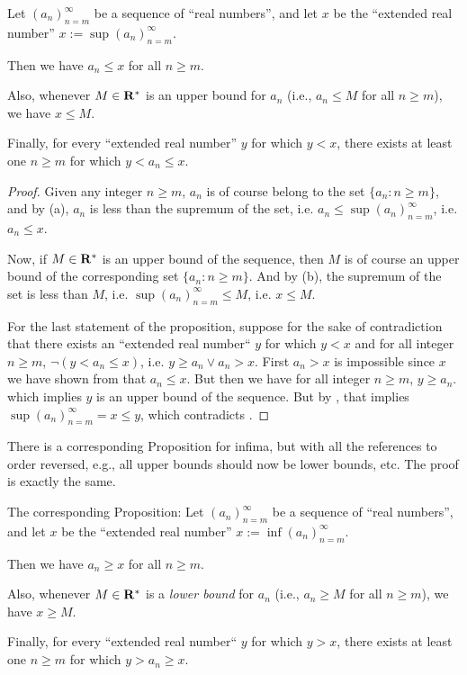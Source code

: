 \begin{proposition}  \label{prop 6.3.6}
Let \((a_n)_{n = m}^{\infty}\) be a sequence of ``real numbers'', and let \(x\) be the ``extended real number'' \(x := \sup(a_n)_{n = m}^{\infty}\).

 Then we have \(a_n \le x\) for all \(n \ge m\).

 Also, whenever \(M \in \mathbf{R}^*\) is an upper bound for \(a_n\) (i.e., \(a_n \le M\) for all \(n \ge m\)), we have \(x \le M\).

 Finally, for every ``extended real number'' \(y\) for which \(y < x\), there exists at least one \(n \ge m\) for which \(y < a_n \le x\).
\end{proposition}

\begin{proof}
 Given any integer \(n \ge m\), \(a_n\) is of course belong to the set \(\{a_n : n \ge m\}\), and by (a), \(a_n\) is less than the supremum of the set, i.e. \(a_n \le \sup(a_n)_{n = m}^{\infty}\), i.e. \(a_n \le x\).

 Now, if \(M \in \mathbf{R}^*\) is an upper bound of the sequence, then \(M\) is of course an upper bound of the corresponding set \(\{a_n : n \ge m\}\).
And by (b), the supremum of the set is less than \(M\), i.e. \(\sup(a_n)_{n = m}^{\infty} \le M\), i.e. \(x \le M\).

 For the last statement of the proposition, suppose for the sake of contradiction that there exists an ``extended real number`` \(y\) for which \(y < x\)  and for all integer \(n \ge m\), \(\lnot (y < a_n \le x)\), i.e. \(y \ge a_n \lor a_n > x\).
First \(a_n > x\) is impossible since \(x\) we have shown from  that \(a_n \le x\).
But then we have for all integer \(n \ge m\), \(y \ge a_n\). which implies \(y\) is an upper bound of the sequence.
But by , that implies \(\sup(a_n)_{n = m}^{\infty} = x \le y\), which contradicts .
\end{proof}

\begin{remark} \label{remark 6.3.7}
There is a corresponding Proposition for infima, but with all the references to order reversed, e.g., all upper bounds should now be lower bounds, etc.
The proof is exactly the same.

The corresponding Proposition: Let \((a_n)_{n = m}^{\infty}\) be a sequence of ``real numbers'', and let \(x\) be the ``extended real number'' \(x := \inf(a_n)_{n = m}^{\infty}\).

 Then we have \(a_n \ge x\) for all \(n \ge m\).

 Also, whenever \(M \in \mathbf{R}^*\) is a \emph{lower bound} for \(a_n\) (i.e., \(a_n \ge M\) for all \(n \ge m\)), we have \(x \ge M\).

 Finally, for every ``extended real number`` \(y\) for which \(y > x\), there exists at least one \(n \ge m\) for which \(y > a_n \ge x\).
\end{remark}

